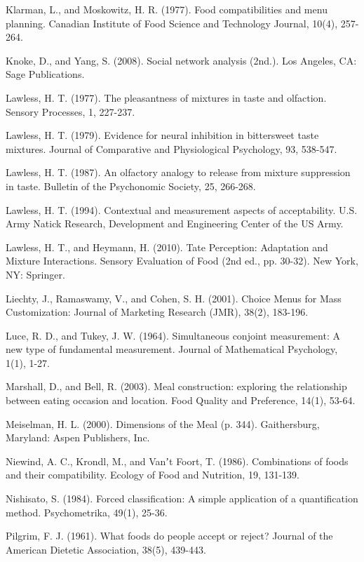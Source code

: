 \noindent
Klarman, L., and Moskowitz, H. R. (1977). Food compatibilities and menu planning. Canadian Institute of Food Science and Technology Journal, 10(4), 257-264.

\noindent
Knoke, D., and Yang, S. (2008). Social network analysis (2nd.). Los Angeles, CA: Sage Publications.

\noindent
Lawless, H. T. (1977). The pleasantness of mixtures in taste and olfaction. Sensory Processes, 1, 227-237.

\noindent
Lawless, H. T. (1979). Evidence for neural inhibition in bittersweet taste mixtures. Journal of Comparative and Physiological Psychology, 93, 538-547.

\noindent
Lawless, H. T. (1987). An olfactory analogy to release from mixture suppression in taste. Bulletin of the Psychonomic Society, 25, 266-268.

\noindent
Lawless, H. T. (1994). Contextual and measurement aspects of acceptability. U.S. Army Natick Research, Development and Engineering Center of the US Army.

\noindent
Lawless, H. T., and Heymann, H. (2010). Tate Perception: Adaptation and Mixture Interactions. Sensory Evaluation of Food (2nd ed., pp. 30-32). New York, NY: Springer. 

\noindent
Liechty, J., Ramaswamy, V., and Cohen, S. H. (2001). Choice Menus for Mass Customization: Journal of Marketing Research (JMR), 38(2), 183-196.

\noindent
Luce, R. D., and Tukey, J. W. (1964). Simultaneous conjoint measurement: A new type of fundamental measurement. Journal of Mathematical Psychology, 1(1), 1-27.

\noindent
Marshall, D., and Bell, R. (2003). Meal construction: exploring the relationship between eating occasion and location. Food Quality and Preference, 14(1), 53-64. 

\noindent
Meiselman, H. L. (2000). Dimensions of the Meal (p. 344). Gaithersburg, Maryland: Aspen Publishers, Inc.

\noindent
Niewind, A. C., Krondl, M., and Vanʼt Foort, T. (1986). Combinations of foods and their compatibility. Ecology of Food and Nutrition, 19, 131-139.

\noindent
Nishisato, S. (1984). Forced classification: A simple application of a quantification method. Psychometrika, 49(1), 25-36.

\noindent
Pilgrim, F. J. (1961). What foods do people accept or reject? Journal of the American Dietetic Association, 38(5), 439-443.

